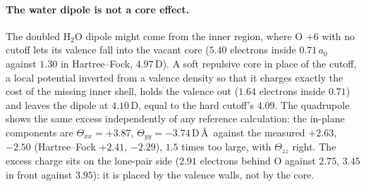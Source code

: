\documentclass[11pt]{article}
\begin{document}
\paragraph{The water dipole is not a core effect.} The doubled H$_2$O dipole might come from the inner
region, where O $+6$ with no cutoff lets its valence fall into the vacant core ($5.40$ electrons inside
$0.71\,a_0$ against $1.30$ in Hartree--Fock, $4.97$\,D). A soft repulsive core in place of the cutoff, a local
potential inverted from a valence density so that it charges exactly the cost of the missing inner shell,
holds the valence out ($1.64$ electrons inside $0.71$) and leaves the dipole at $4.10$\,D, equal to the hard
cutoff's $4.09$. The quadrupole shows the same excess independently of any reference calculation: the
in-plane components are $\Theta_{xx} = +3.87$, $\Theta_{yy} = -3.74$\,D\,\AA\ against the measured $+2.63$,
$-2.50$ (Hartree--Fock $+2.41$, $-2.29$), $1.5$ times too large, with $\Theta_{zz}$ right. The excess charge
sits on the lone-pair side ($2.91$ electrons behind O against $2.75$, $3.45$ in front against $3.95$): it is
placed by the valence walls, not by the core.
\end{document}
